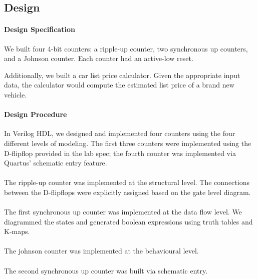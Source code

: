 \documentclass{article}
\begin{document}
  \subsection{Design}

  \paragraph{Design Specification} We built four 4-bit counters: a ripple-up counter, two synchronous up counters, and a Johnson counter. Each counter had an active-low reset. 

  Additionally, we built a car list price calculator. Given the appropriate input data, the calculator would compute the estimated list price of a brand new vehicle.

  \paragraph{Design Procedure} In Verilog HDL, we designed and implemented four counters using the four different levels of modeling. The first three counters were implemented using the D-flipflop provided in the lab spec; the fourth counter was implemented via Quartus' schematic entry feature.

  

  \paragraph{}The ripple-up counter was implemented at the structural level. The connections between the D-flipflops were explicitly assigned based on the gate level diagram.

  \paragraph{}The first synchronous up counter was implemented at the data flow level. We diagrammed the states and generated boolean expressions using truth tables and K-maps.

  \paragraph{}The johnson counter was implemented at the behavioural level. 

  \paragraph{}The second synchronous up counter was built via schematic entry.
\end{document}
